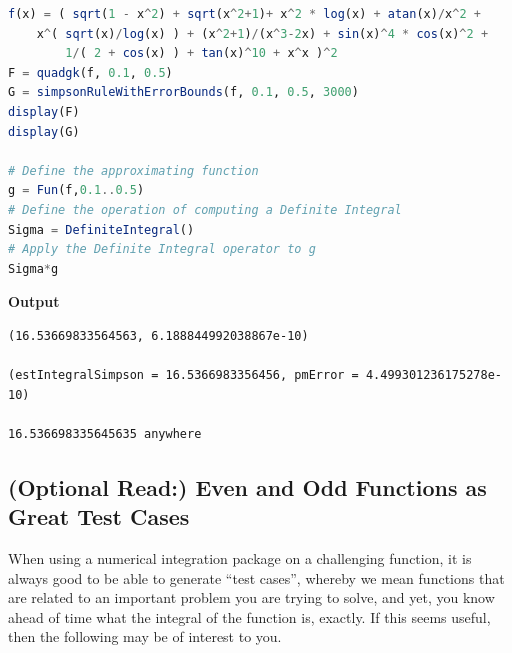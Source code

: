 \begin{lstlisting}[language=Julia,style=mystyle]
f(x) = ( sqrt(1 - x^2) + sqrt(x^2+1)+ x^2 * log(x) + atan(x)/x^2 + 
    x^( sqrt(x)/log(x) ) + (x^2+1)/(x^3-2x) + sin(x)^4 * cos(x)^2 +
        1/( 2 + cos(x) ) + tan(x)^10 + x^x )^2
F = quadgk(f, 0.1, 0.5)
G = simpsonRuleWithErrorBounds(f, 0.1, 0.5, 3000)
display(F)
display(G)

# Define the approximating function
g = Fun(f,0.1..0.5) 
# Define the operation of computing a Definite Integral
Sigma = DefiniteIntegral() 
# Apply the Definite Integral operator to g
Sigma*g
\end{lstlisting}
\textbf{Output} 
\begin{verbatim}
(16.53669833564563, 6.188844992038867e-10)

(estIntegralSimpson = 16.5366983356456, pmError = 4.499301236175278e-10)

16.536698335645635 anywhere
\end{verbatim}

\bigskip

\subsection{(Optional Read:) Even and Odd Functions as Great Test Cases}

When using a numerical integration package on a challenging function, it is always good to be able to generate ``test cases'', whereby we mean functions that are related to an important problem you are trying to solve, and yet, you know ahead of time what the integral of the function is, exactly. If this seems useful, then the following may be of interest to you. 

\bigskip

